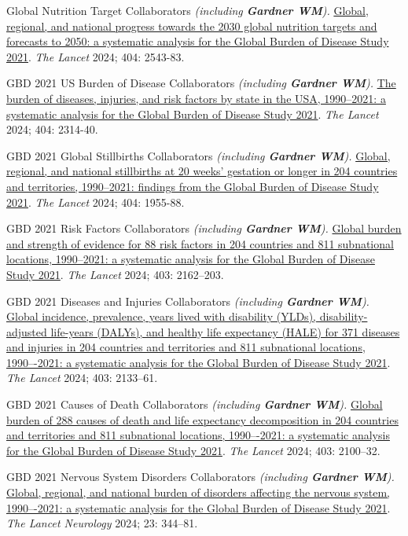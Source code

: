 \documentclass[11pt,article,oneside]{memoir}
\begin{document}
\ind Global Nutrition Target Collaborators \emph{(including \textbf{Gardner WM}).} \href{https://doi.org/10.1016/S0140-6736(24)01821-X}{Global, regional, and national progress towards the 2030 global nutrition targets and forecasts to 2050: a systematic 
analysis for the Global Burden of Disease Study 2021}. \emph{The Lancet} 2024; 404: 2543-83. 

\ind GBD 2021 US Burden of Disease Collaborators \emph{(including \textbf{Gardner WM}).} \href{https://doi.org/10.1016/S0140-6736(24)01446-6}{The burden of diseases, injuries, and risk factors by state in the USA, 1990–2021: a systematic analysis for 
the Global Burden of Disease Study 2021}. \emph{The Lancet} 2024; 404: 2314-40. 

\ind GBD 2021 Global Stillbirths Collaborators \emph{(including \textbf{Gardner WM}).} \href{https://doi.org/10.1016/S0140-6736(24)01925-1}{Global, regional, and national stillbirths at 20 weeks' gestation or longer in 204 countries and territories, 
1990–2021: findings from the Global Burden of Disease Study 2021}. \emph{The Lancet} 2024; 404: 1955-88. 

\ind GBD 2021 Risk Factors Collaborators \emph{(including \textbf{Gardner WM}).} \href{https://doi.org/10.1016/S0140-6736(24)00933-4}{Global burden and strength of evidence for 88 risk factors in 204 countries and 811 subnational locations, 
1990–2021: a systematic analysis for the Global Burden of Disease Study 2021}. \emph{The Lancet} 2024; 403: 2162--203.

\ind GBD 2021 Diseases and Injuries Collaborators \emph{(including \textbf{Gardner WM}).} \href{https://doi.org/10.1016/S0140-6736(24)00757-8}{Global incidence, prevalence, years lived with disability (YLDs), disability-adjusted life-years (DALYs), 
and healthy life expectancy (HALE) for 371 diseases and injuries in 204 countries and territories and 811 subnational locations, 1990–-2021: a systematic analysis for the Global Burden of Disease Study 2021}. \emph{The Lancet} 2024; 403: 2133--61.

\ind GBD 2021 Causes of Death Collaborators \emph{(including \textbf{Gardner WM}).} \href{https://doi.org/10.1016/S0140-6736(24)00367-2}{Global burden of 288 causes of death and life expectancy decomposition in 204 countries and 
territories and 811 subnational locations, 1990–-2021: a systematic analysis for the Global Burden of Disease Study 2021}. \emph{The Lancet} 2024; 403: 2100--32.

\ind GBD 2021 Nervous System Disorders Collaborators \emph{(including \textbf{Gardner WM}).} \href{https://doi.org/10.1016/S1474-4422(24)00038-3}{Global, regional, and national burden of disorders affecting the nervous system, 
1990–-2021: a systematic analysis for the Global Burden of Disease Study 2021}. \emph{The Lancet Neurology} 2024; 23: 344--81. 
\end{document}
